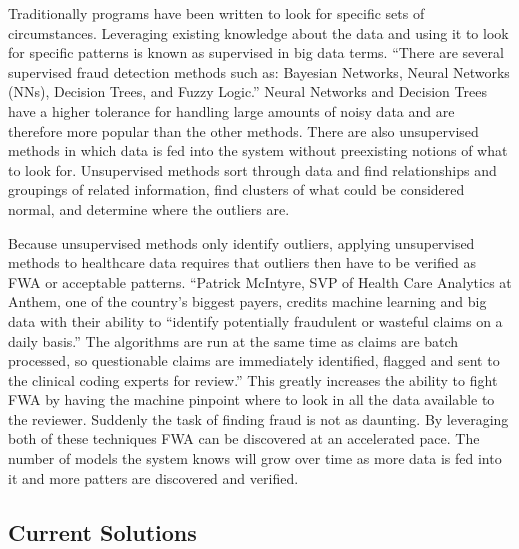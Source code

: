 \documentclass[sigconf]{acmart}
\begin{document}
Traditionally programs have been written to look for specific sets of circumstances.  
Leveraging existing knowledge about the data and using it to look for specific patterns 
is known as supervised in big data terms.  ``There are several supervised fraud detection 
methods such as: Bayesian Networks, Neural Networks (NNs), Decision Trees, and Fuzzy 
Logic.''\cite{Ghuse}  Neural Networks and Decision Trees have a higher tolerance for 
handling large amounts of noisy data and are therefore more popular than the other 
methods.  There are also unsupervised methods in which data is fed into the system 
without preexisting notions of what to look for\cite{Ghuse}.  Unsupervised methods sort 
through data and find relationships and groupings of related information, find clusters 
of what could be considered normal, and determine where the outliers are.

Because unsupervised methods only identify outliers, applying unsupervised methods to 
healthcare data requires that outliers then have to be verified as FWA or 
acceptable patterns.  ``Patrick McIntyre, SVP of Health Care Analytics at Anthem, one 
of the country's biggest payers, credits machine learning and big data with their 
ability to ``identify potentially fraudulent or wasteful claims on a daily basis.'' The 
algorithms are run at the same time as claims are batch processed, so questionable 
claims are immediately identified, flagged and sent to the clinical coding experts for 
review.''\cite{Datameer}  This greatly increases the ability to fight FWA by having the 
machine pinpoint where to look in all the data available to the reviewer.  Suddenly the task 
of finding fraud is not as daunting.  By leveraging both of these techniques FWA can be 
discovered at an accelerated pace.  The number of models the system knows will grow over 
time as more data is fed into it and more patters are discovered and verified.


\subsection{Current Solutions}
\end{document}

